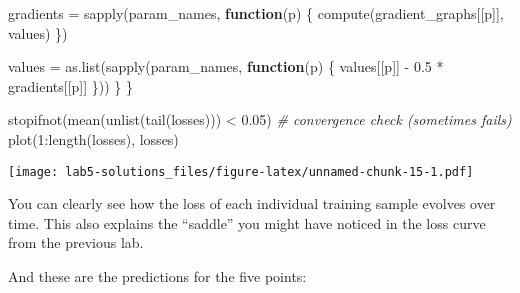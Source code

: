 \documentclass[
  a4paper,
]{article}
\newenvironment{Shaded}{\begin{snugshade}}{\end{snugshade}}
\newcommand{\CommentTok}[1]{\textcolor[rgb]{0.56,0.35,0.01}{\textit{#1}}}
\newcommand{\ControlFlowTok}[1]{\textcolor[rgb]{0.13,0.29,0.53}{\textbf{#1}}}
\newcommand{\DecValTok}[1]{\textcolor[rgb]{0.00,0.00,0.81}{#1}}
\newcommand{\FloatTok}[1]{\textcolor[rgb]{0.00,0.00,0.81}{#1}}
\newcommand{\FunctionTok}[1]{\textcolor[rgb]{0.00,0.00,0.00}{#1}}
\newcommand{\NormalTok}[1]{#1}
\newcommand{\OtherTok}[1]{\textcolor[rgb]{0.56,0.35,0.01}{#1}}
\newcommand{\SpecialCharTok}[1]{\textcolor[rgb]{0.00,0.00,0.00}{#1}}
\newcommand{\StringTok}[1]{\textcolor[rgb]{0.31,0.60,0.02}{#1}}
\begin{document}
\begin{Shaded}
\begin{Highlighting}[]
\NormalTok{    gradients }\OtherTok{=} \FunctionTok{sapply}\NormalTok{(param\_names, }\ControlFlowTok{function}\NormalTok{(p) \{}
      \FunctionTok{compute}\NormalTok{(gradient\_graphs[[p]], values)}
\NormalTok{    \})}
    
\NormalTok{    values }\OtherTok{=} \FunctionTok{as.list}\NormalTok{(}\FunctionTok{sapply}\NormalTok{(param\_names, }\ControlFlowTok{function}\NormalTok{(p) \{}
\NormalTok{      values[[p]] }\SpecialCharTok{{-}} \FloatTok{0.5} \SpecialCharTok{*}\NormalTok{ gradients[[p]]}
\NormalTok{    \}))}
\NormalTok{  \}}
\NormalTok{\}}

\FunctionTok{stopifnot}\NormalTok{(}\FunctionTok{mean}\NormalTok{(}\FunctionTok{unlist}\NormalTok{(}\FunctionTok{tail}\NormalTok{(losses))) }\SpecialCharTok{\textless{}} \FloatTok{0.05}\NormalTok{) }\CommentTok{\# convergence check (sometimes fails)}
\FunctionTok{plot}\NormalTok{(}\DecValTok{1}\SpecialCharTok{:}\FunctionTok{length}\NormalTok{(losses), losses)}
\end{Highlighting}
\end{Shaded}

\texttt{[image: lab5-solutions\_files/figure-latex/unnamed-chunk-15-1.pdf]}

You can clearly see how the loss of each individual training sample
evolves over time. This also explains the ``saddle'' you might have
noticed in the loss curve from the previous lab.

And these are the predictions for the five points:

\begin{Shaded}
\end{Shaded}
\end{document}
